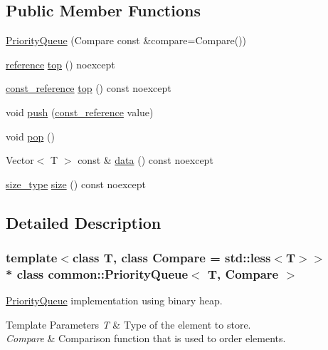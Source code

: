 \subsection*{Public Member Functions}
\begin{DoxyCompactItemize}
\item 
\hyperlink{classcommon_1_1PriorityQueue_af0a3b595aac162d4a20c75caa4a65326}{Priority\+Queue} (Compare const \&compare=Compare())
\item 
\hyperlink{classcommon_1_1PriorityQueue_ab373612fd8bc3716f22936d6b6454b86}{reference} \hyperlink{classcommon_1_1PriorityQueue_abbbde5cab4d7e63fb6ceacbdc49ea72f}{top} () noexcept
\item 
\hyperlink{classcommon_1_1PriorityQueue_ae9270b1553c1337f99508699590ee7c0}{const\+\_\+reference} \hyperlink{classcommon_1_1PriorityQueue_ad9054b1e9619b25e58093e4062bfb572}{top} () const noexcept
\item 
void \hyperlink{classcommon_1_1PriorityQueue_a9ef038beba24f28a531549c0efe897e1}{push} (\hyperlink{classcommon_1_1PriorityQueue_ae9270b1553c1337f99508699590ee7c0}{const\+\_\+reference} value)
\item 
void \hyperlink{classcommon_1_1PriorityQueue_ae6ac69810a0341b7ff6e8bce859474d4}{pop} ()
\item 
Vector$<$ T $>$ const \& \hyperlink{classcommon_1_1PriorityQueue_a4d8f6971c573d31d6b063ae4e1d8512a}{data} () const noexcept
\item 
\hyperlink{classcommon_1_1PriorityQueue_ab57641d3a949b913edba887241ca6e7d}{size\+\_\+type} \hyperlink{classcommon_1_1PriorityQueue_a3be24d83880082c1e1d97e362b2ed25c}{size} () const noexcept
\end{DoxyCompactItemize}


\subsection{Detailed Description}
\subsubsection*{template$<$class T, class Compare = std\+::less$<$\+T$>$$>$\\*
class common\+::\+Priority\+Queue$<$ T, Compare $>$}

\hyperlink{classcommon_1_1PriorityQueue}{Priority\+Queue} implementation using binary heap. 
\begin{DoxyTemplParams}{Template Parameters}
{\em T} & Type of the element to store. \\
\hline
{\em Compare} & Comparison function that is used to order elements. \\
\hline
\end{DoxyTemplParams}


